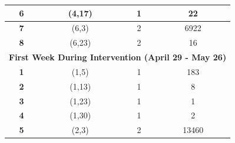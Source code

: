 \begin{table}
\begin{tabular}{cccc}
\textbf{6}              & (4,17)                                                                     & 1                                                                           & 22                                                                             \\ \hline
\textbf{7}              & (6,3)                                                                      & 2                                                                           & 6922                                                                           \\ \hline
\textbf{8}              & (6,23)                                                                     & 2                                                                           & 16                                                                             \\ \hline
\multicolumn{4}{c}{\cellcolor[HTML]{ECF4FF}\textbf{First Week During Intervention (April 29 - May 26)}}                                                                                                                                                             \\ \hline
\textbf{1}              & (1,5)                                                                      & 1                                                                           & 183                                                                            \\ \hline
\textbf{2}              & (1,13)                                                                     & 1                                                                           & 8                                                                              \\ \hline
\textbf{3}              & (1,23)                                                                     & 1                                                                           & 1                                                                              \\ \hline
\textbf{4}              & (1,30)                                                                     & 1                                                                           & 2                                                                              \\ \hline
\textbf{5}              & (2,3)                                                                      & 2                                                                           & 13460                                                                          \\ \hline

\end{tabular}
\end{table}
